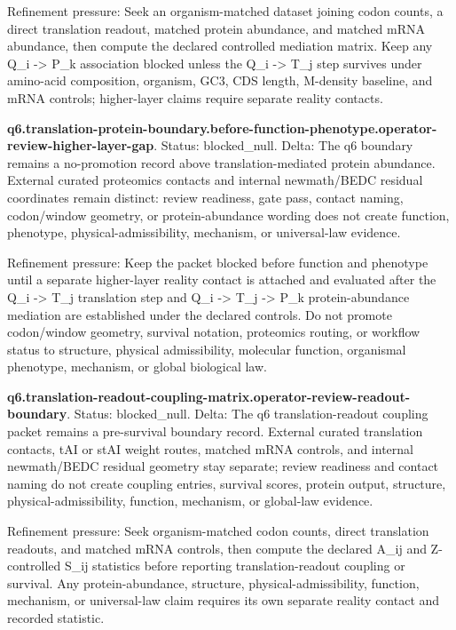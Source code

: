 Refinement pressure: Seek an organism-matched dataset joining codon counts, a direct translation readout, matched protein abundance, and matched mRNA abundance, then compute the declared controlled mediation matrix. Keep any Q\_i -> P\_k association blocked unless the Q\_i -> T\_j step survives under amino-acid composition, organism, GC3, CDS length, M-density baseline, and mRNA controls; higher-layer claims require separate reality contacts.

\textbf{q6.translation-protein-boundary.before-function-phenotype.operator-review-higher-layer-gap}. Status: blocked\_null. Delta: The q6 boundary remains a no-promotion record above translation-mediated protein abundance. External curated proteomics contacts and internal newmath/BEDC residual coordinates remain distinct: review readiness, gate pass, contact naming, codon/window geometry, or protein-abundance wording does not create function, phenotype, physical-admissibility, mechanism, or universal-law evidence.

Refinement pressure: Keep the packet blocked before function and phenotype until a separate higher-layer reality contact is attached and evaluated after the Q\_i -> T\_j translation step and Q\_i -> T\_j -> P\_k protein-abundance mediation are established under the declared controls. Do not promote codon/window geometry, survival notation, proteomics routing, or workflow status to structure, physical admissibility, molecular function, organismal phenotype, mechanism, or global biological law.

\textbf{q6.translation-readout-coupling-matrix.operator-review-readout-boundary}. Status: blocked\_null. Delta: The q6 translation-readout coupling packet remains a pre-survival boundary record. External curated translation contacts, tAI or stAI weight routes, matched mRNA controls, and internal newmath/BEDC residual geometry stay separate; review readiness and contact naming do not create coupling entries, survival scores, protein output, structure, physical-admissibility, function, mechanism, or global-law evidence.

Refinement pressure: Seek organism-matched codon counts, direct translation readouts, and matched mRNA controls, then compute the declared A\_ij and Z-controlled S\_ij statistics before reporting translation-readout coupling or survival. Any protein-abundance, structure, physical-admissibility, function, mechanism, or universal-law claim requires its own separate reality contact and recorded statistic.

